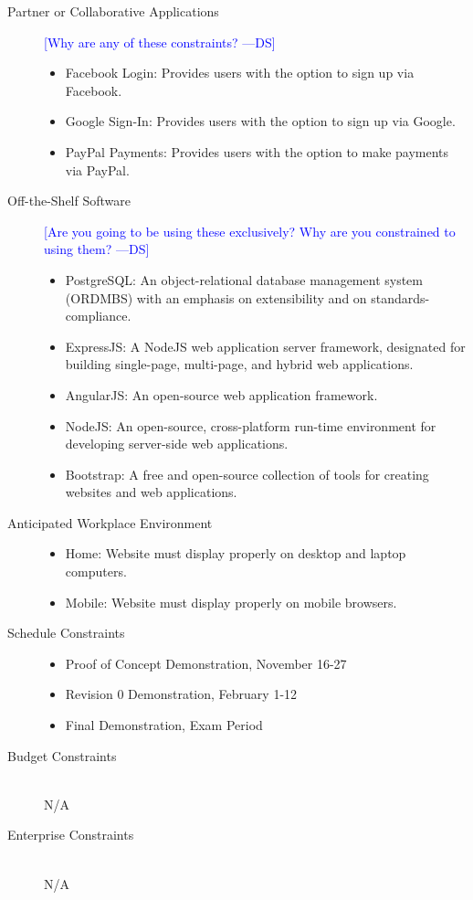 \documentclass[12pt, titlepage]{article}
\newcommand{\authornote}[3]{\textcolor{#1}{[#3 ---#2]}}
\newcommand{\authornote}[3]{}
\newcommand{\ds}[1]{\authornote{blue}{DS}{#1}}
\begin{document}
\begin{description}
\begin{itemize}
    \end{itemize}
  \item[Partner or Collaborative Applications] \hfil 
	\ds{Why are any of these constraints?}
    \begin{itemize}
    \item Facebook Login: Provides users with the option to sign up via 
Facebook.
    \item Google Sign-In: Provides users with the option to sign up via Google.
    \item PayPal Payments: Provides users with the option to make payments
          via PayPal. \\
    \end{itemize}
  \item[Off-the-Shelf Software] \hfill 
  \ds{Are you going to be using these exclusively? Why are you constrained to using them?}
    \begin{itemize}
    \item PostgreSQL: An object-relational database management system (ORDMBS)
      with an emphasis on extensibility and on standards-compliance.
    \item ExpressJS: A NodeJS web application server framework, designated for
      building single-page, multi-page, and hybrid web applications.
    \item AngularJS: An open-source web application framework.
    \item NodeJS: An open-source, cross-platform run-time environment for
      developing server-side web applications.
    \item Bootstrap: A free and open-source collection of tools for creating
      websites and web applications. \\
    \end{itemize}
  \item[Anticipated Workplace Environment] \hfill 
    \begin{itemize}
    \item Home: Website must display properly on desktop and laptop computers.
    \item Mobile: Website must display properly on mobile browsers. \\
    \end{itemize}
  \item[Schedule Constraints] \hfill 
    \begin{itemize}
    \item Proof of Concept Demonstration, November 16-27
    \item Revision 0 Demonstration, February 1-12
    \item Final Demonstration, Exam Period
    \end{itemize}
  \item[Budget Constraints] \hfill \\
    N/A
  \item[Enterprise Constraints] \hfill \\
    N/A
\end{description}
\end{document}
